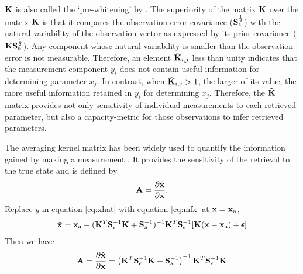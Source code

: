 $\tilde{\mathbf{K}}$ is also called the ‘pre-whitening’ by \cite{Rodgers00}. 
The superiority of the matrix $\tilde{\mathbf{K}}$ over the matrix $\mathbf{K}$ is 
that it compares the observation error covariance
($\mathbf{S}_\epsilon^{\frac{1}{2}}$) with the natural variability of the
observation vector as expressed by its prior covariance
($\mathbf{K}\mathbf{S}_\text{a}^{\frac{1}{2}}$).
Any component whose natural variability is smaller than the observation
error is not measurable. Therefore, an element $\tilde{\mathbf{K}}_{i,j}$ less than
unity indicates that the measurement component $y_i$ does not contain useful
information for determining parameter $x_j$. In contrast, when
$\tilde{\mathbf{K}}_{i,j}>1$, the larger of its value, the more useful
information retained in $y_i$ for determining $x_j$. Therefore, the
$\tilde{\mathbf{K}}$ matrix provides not only sensitivity of individual 
measurements to each retrieved parameter, but also a capacity-metric 
for those observations to infer retrieved parameters. 

The averaging kernel matrix has been widely used to quantify the
information gained by making a measurement \citep[e.g.,][]{Rodgers98,
Hasekamp05a, Frankenberg12, Sanghavi12}. It provides the sensitivity of 
the retrieval to the true state and is defined by 
\begin{equation}
\mathbf{A}=\frac{\partial{\hat{\mathbf{x}}}}{\partial\mathbf{x}}. 
\end{equation}
Replace $y$ in equation \eqref{eq:xhat} with equation \eqref{eq:mfx}
at $\mathbf{x}=\mathbf{x}_\text{a}$, 
\begin{equation}
\hat{\mathbf{x}} = \mathbf{x}_\text{a} + (\mathbf{K}^T\mathbf{S}_\epsilon^{-1}\mathbf{K}+\mathbf{S}_\text{a}^{-1})^{-1}
\mathbf{K}^T\mathbf{S}_\epsilon^{-1}[\mathbf{K}(\mathbf{x}-\mathbf{x}_\text{a})+\pmb{\epsilon}] 
\end{equation}
Then we have
\begin{equation}
\mathbf{A}=\frac{\partial{\hat{\mathbf{x}}}}{\partial\mathbf{x}}
    =\left(\mathbf{K}^T\mathbf{S}_\epsilon^{-1}\mathbf{K}+\mathbf{S}_\text{a}^{-1}\right)^{-1}
     \mathbf{K}^T\mathbf{S}_\epsilon^{-1}\mathbf{K}
\end{equation}

